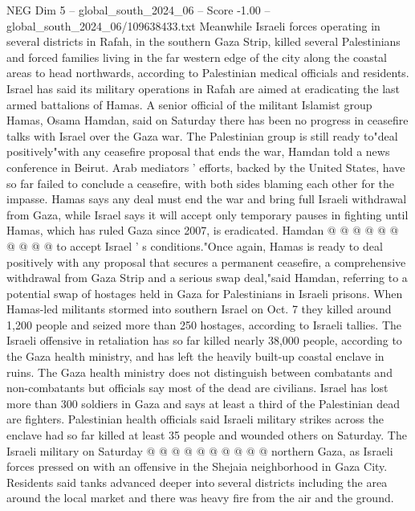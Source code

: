 \begin{textsample}{NEG Dim 5 – global\_south\_2024\_06 – Score -1.00 – global\_south\_2024\_06/109638433.txt}  \label{ex:f5_neg_224}
Meanwhile Israeli forces operating in several districts in Rafah, in the southern Gaza Strip, killed several Palestinians and forced families living in the far western edge of the city along the coastal areas to head northwards, according to Palestinian medical officials and residents.
Israel has said its military operations in Rafah are aimed at eradicating the last armed battalions of Hamas.
A senior official of the militant Islamist group Hamas, Osama Hamdan, said on Saturday there has been no progress in ceasefire talks with Israel over the Gaza war.
The Palestinian group is still ready to"deal positively"with any ceasefire proposal that ends the war, Hamdan told a news conference in Beirut.
Arab mediators ' efforts, backed by the United States, have so far failed to conclude a ceasefire, with both sides blaming each other for the impasse.
Hamas says any deal must end the war and bring full Israeli withdrawal from Gaza, while Israel says it will accept only temporary pauses in fighting until Hamas, which has ruled Gaza since 2007, is eradicated.
Hamdan @ @ @ @ @ @ @ @ @ @ to accept Israel ' s conditions."Once again, Hamas is ready to deal positively with any proposal that secures a permanent ceasefire, a comprehensive withdrawal from Gaza Strip and a serious swap deal,"said Hamdan, referring to a potential swap of hostages held in Gaza for Palestinians in Israeli prisons.
When Hamas-led militants stormed into southern Israel on Oct. 7 they killed around 1,200 people and seized more than 250 hostages, according to Israeli tallies.
The Israeli offensive in retaliation has so far killed nearly 38,000 people, according to the Gaza health ministry, and has left the heavily built-up coastal enclave in ruins.
The Gaza health ministry does not distinguish between combatants and non-combatants but officials say most of the dead are civilians.
Israel has lost more than 300 soldiers in Gaza and says at least a third of the Palestinian dead are fighters.
Palestinian health officials said Israeli military strikes across the enclave had so far killed at least 35 people and wounded others on Saturday.
The Israeli military on Saturday @ @ @ @ @ @ @ @ @ @ northern Gaza, as Israeli forces pressed on with an offensive in the Shejaia neighborhood in Gaza City.
Residents said tanks advanced deeper into several districts including the area around the local market and there was heavy fire from the air and the ground.

\end{textsample}
